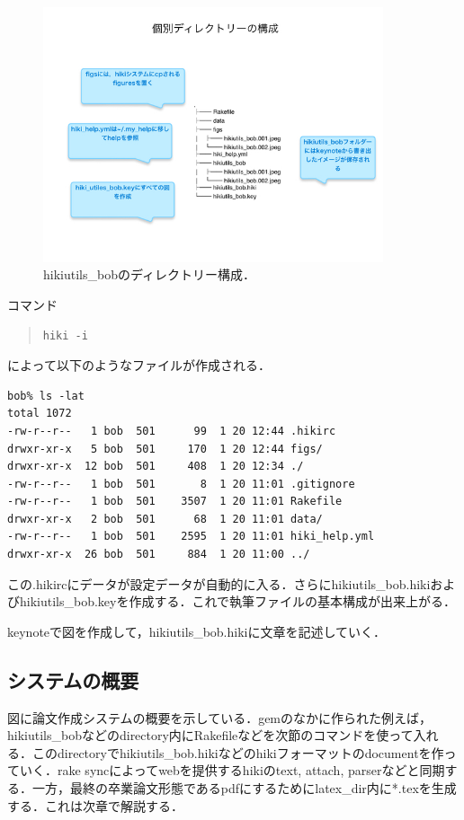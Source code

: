 \begin{figure}[htbp]\begin{center}
\includegraphics[width=10cm,bb= 0 0 737 553]{../figs/./hikiutils_bob.003.jpeg}
\caption{hikiutils\_bobのディレクトリー構成．}
\label{default}\end{center}\end{figure}
コマンド
\begin{quote}\begin{verbatim}
hiki -i
\end{verbatim}\end{quote}
によって以下のようなファイルが作成される．
\begin{lstlisting}[style=customCsh,basicstyle={\scriptsize\ttfamily}]
bob% ls -lat
total 1072
-rw-r--r--   1 bob  501      99  1 20 12:44 .hikirc
drwxr-xr-x   5 bob  501     170  1 20 12:44 figs/
drwxr-xr-x  12 bob  501     408  1 20 12:34 ./
-rw-r--r--   1 bob  501       8  1 20 11:01 .gitignore
-rw-r--r--   1 bob  501    3507  1 20 11:01 Rakefile
drwxr-xr-x   2 bob  501      68  1 20 11:01 data/
-rw-r--r--   1 bob  501    2595  1 20 11:01 hiki_help.yml
drwxr-xr-x  26 bob  501     884  1 20 11:00 ../
\end{lstlisting}
この.hikircにデータが設定データが自動的に入る．さらにhikiutils\_bob.hikiおよびhikiutils\_bob.keyを作成する．これで執筆ファイルの基本構成が出来上がる．

keynoteで図を作成して，hikiutils\_bob.hikiに文章を記述していく．

\subsection{システムの概要}
図に論文作成システムの概要を示している．gemのなかに作られた例えば，hikiutils\_bobなどのdirectory内にRakefileなどを次節のコマンドを使って入れる．このdirectoryでhikiutils\_bob.hikiなどのhikiフォーマットのdocumentを作っていく．rake syncによってwebを提供するhikiのtext, attach, parserなどと同期する．一方，最終の卒業論文形態であるpdfにするためにlatex\_dir内に*.texを生成する．これは次章で解説する．

